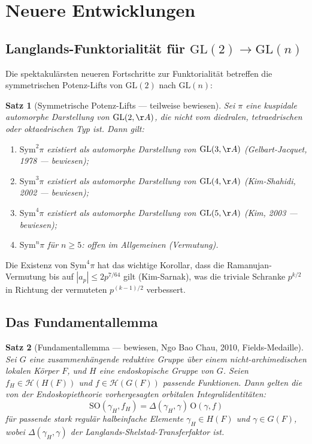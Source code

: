 \documentclass[12pt,a4paper]{amsart}
\newtheorem{theorem}{Satz}[section]
\theoremstyle{definition}
\newcommand{\GL}{\mathrm{GL}}
\begin{document}
\section{Neuere Entwicklungen}
\label{sec:neueres}

\subsection{Langlands-Funktorialität für \texorpdfstring{$\GL(2) \to \GL(n)$}{GL(2) nach GL(n)}}

Die spektakulärsten neueren Fortschritte zur Funktorialität betreffen die
symmetrischen Potenz-Lifts von $\GL(2)$ nach $\GL(n)$:

\begin{theorem}[Symmetrische Potenz-Lifts — teilweise bewiesen]
\label{satz:sym_lift}
Sei $\pi$ eine kuspidale automorphe Darstellung von $\GL(2,\AA)$, die nicht vom
diedralen, tetraedrischen oder oktaedrischen Typ ist. Dann gilt:
\begin{enumerate}[label=(\roman*)]
\item $\mathrm{Sym}^2 \pi$ existiert als automorphe Darstellung von $\GL(3,\AA)$
  (Gelbart-Jacquet, 1978 — bewiesen);
\item $\mathrm{Sym}^3 \pi$ existiert als automorphe Darstellung von $\GL(4,\AA)$
  (Kim-Shahidi, 2002 — bewiesen);
\item $\mathrm{Sym}^4 \pi$ existiert als automorphe Darstellung von $\GL(5,\AA)$
  (Kim, 2003 — bewiesen);
\item $\mathrm{Sym}^n \pi$ für $n \geq 5$: offen im Allgemeinen (Vermutung).
\end{enumerate}
\end{theorem}

Die Existenz von $\mathrm{Sym}^4 \pi$ hat das wichtige Korollar, dass die
Ramanujan-Vermutung bis auf $|a_p| \leq 2p^{7/64}$ gilt (Kim-Sarnak), was die
triviale Schranke $p^{k/2}$ in Richtung der vermuteten $p^{(k-1)/2}$ verbessert.

\subsection{Das Fundamentallemma}

\begin{theorem}[Fundamentallemma — bewiesen, Ngo Bao Chau, 2010, Fields-Medaille]
\label{satz:fundamentallemma}
Sei $G$ eine zusammenhängende reduktive Gruppe über einem nicht-archimedischen
lokalen Körper $F$, und $H$ eine endoskopische Gruppe von $G$. Seien $f_H \in \mathcal{H}(H(F))$
und $f \in \mathcal{H}(G(F))$ passende Funktionen. Dann gelten die von der Endoskopietheo\-rie
vorhergesagten orbitalen Integralidentitäten:
\[
\text{SO}(\gamma_H, f_H) = \Delta(\gamma_H, \gamma)\, \text{O}(\gamma, f)
\]
für passende stark regulär halbeinfache Elemente $\gamma_H \in H(F)$ und
$\gamma \in G(F)$, wobei $\Delta(\gamma_H,\gamma)$ der Langlands-Shelstad-Transferfaktor ist.
\end{theorem}
\end{document}
